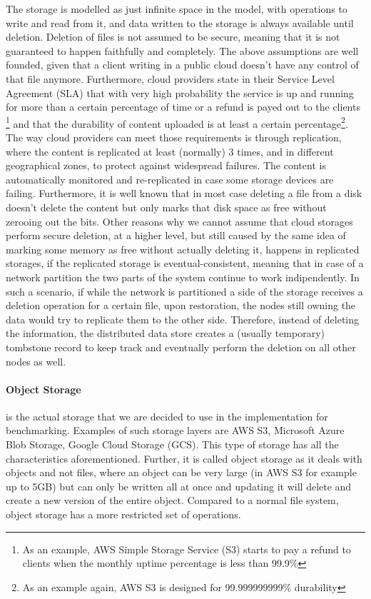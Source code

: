 The storage is modelled as just infinite space in the model, with operations to write and read from it, and data written to the storage is always available until deletion.
Deletion of files is not assumed to be secure, meaning that it is not guaranteed to happen faithfully and completely.
The above assumptions are well founded, given that a client writing in a public cloud doesn't have any control of that file anymore.
Furthermore, cloud providers state in their Service Level Agreement (SLA) that
with very high probability the service is up and running for more than a certain percentage of time or a refund is payed out to the clients
\footnote{As an example, AWS Simple Storage Service (S3) starts to pay a refund to clients when the monthly uptime percentage is less than 99.9\%}
and that the durability of content uploaded is at least a certain percentage\footnote{As an example again, AWS S3 is designed for 99.999999999\% durability}.
The way cloud providers can meet those requirements is through replication, where the content is replicated at least (normally) 3 times, and in different geographical zones, to protect against widespread failures.
The content is automatically monitored and re-replicated in case some storage devices are failing. 
Furthermore, it is well known that in most case deleting a file from a disk doesn't delete the content but only marks that disk space as free without zerooing out the bits. 
Other reasons why we cannot assume that cloud storages perform secure deletion, at a higher level, but still caused by the same idea of marking some memory as free without actually deleting it,
happens in replicated storages, if the replicated storage is eventual-consistent, meaning that in case of a network partition the two parts of the system continue to work indipendently.
In such a scenario, if while the network is partitioned a side of the storage receives a deletion operation for a certain file, upon restoration,
the nodes still owning the data would try to replicate them to the other side.
Therefore, instead of deleting the information, the distributed data store creates a (usually temporary) tombstone record to keep track and eventually perform the deletion on all other nodes as well.

\paragraph{Object Storage} is the actual storage that we are decided to use in the implementation for benchmarking.
Examples of such storage layers are AWS S3, Microsoft Azure Blob Storage, Google Cloud Storage (GCS).
This type of storage has all the characteristics aforementioned.
Further, it is called object storage as it deals with objects and not files, where an object can be very large (in AWS S3 for example up to 5GB) but can only be written all at once and updating it will delete and create a new version of the entire object.
Compared to a normal file system, object storage has a more restricted set of operations.

